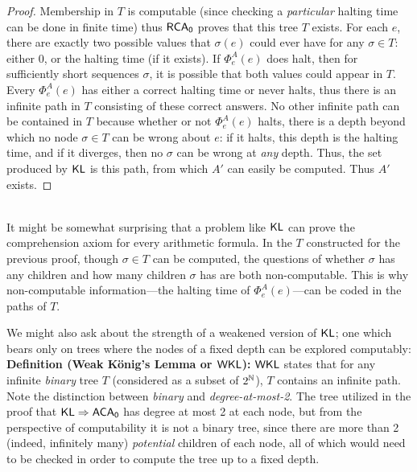 \documentclass{amsart}
\begin{document}
\begin{proof}
		Membership in $T$ is computable (since checking a \textit{particular} halting time can be done in finite time) thus $\operatorname{\sf{RCA_0}}$ proves that this tree $T$ exists.
		For each $e$, there are exactly two possible values that $\sigma(e)$ could ever have for any $\sigma\in T$: either 0, or the halting time (if it exists). If $\Phi^A_e(e)$ does halt, then for sufficiently short sequences $\sigma$, it is possible that both values could appear in $T$.\\
		\indent Every $\Phi^A_e(e)$ has either a correct halting time or never halts, thus there is an infinite path in $T$ consisting of these correct answers. No other infinite path can be contained in $T$ because whether or not $\Phi^A_e(e)$ halts, there is a depth beyond which no node $\sigma\in T$ can be wrong about $e$: if it halts, this depth is the halting time, and if it diverges, then no $\sigma$ can be wrong at \textit{any} depth. Thus, the set produced by $\operatorname{\sf{KL}}$ is this path, from which $A'$ can easily be computed. Thus $A'$ exists.
	\end{proof}\\
	
	It might be somewhat surprising that a problem like $\operatorname{\sf{KL}}$ can prove the comprehension axiom for every arithmetic formula. In the $T$ constructed for the previous proof, though $\sigma\in T$ can be computed, the questions of whether $\sigma$ has any children and how many children $\sigma$ has are both non-computable. This is why non-computable information---the halting time of $\Phi_e^A(e)$---can be coded in the paths of $T$.
	
	We might also ask about the strength of a weakened version of $\operatorname{\sf{KL}}$; one which bears only on trees where the nodes of a fixed depth can be explored computably:\\
	
	\noindent \textbf{Definition (Weak K\"onig's Lemma or $\sf{WKL}$):} $\sf{WKL}$ states that for any infinite \textit{binary} tree $T$ (considered as a subset of $2^{\mathbb{N}}$), $T$ contains an infinite path.\\
	
	Note the distinction between \textit{binary} and \textit{degree-at-most-2}. The tree utilized in the proof that $\operatorname{\sf{KL}} \Rightarrow \operatorname{\sf{ACA_0}}$ has degree at most 2 at each node, but from the perspective of computability it is not a binary tree, since there are more than 2 (indeed, infinitely many) \textit{potential} children of each node, all of which would need to be checked in order to compute the tree up to a fixed depth.\\
	
\end{document}
